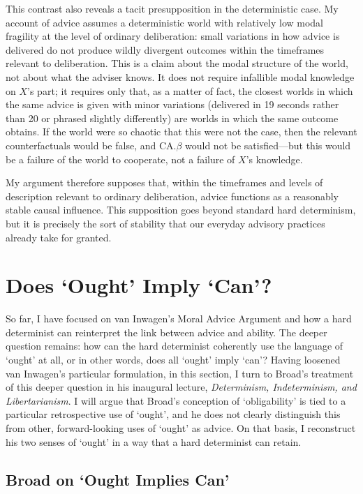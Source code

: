 This contrast also reveals a tacit presupposition in the deterministic
case. My account of advice assumes a deterministic world with relatively
low modal fragility at the level of ordinary deliberation: small
variations in how advice is delivered do not produce wildly divergent
outcomes within the timeframes relevant to deliberation. This is a claim
about the modal structure of the world, not about what the adviser
knows. It does not require infallible modal knowledge on $X$'s part; it
requires only that, as a matter of fact, the closest worlds in which the
same advice is given with minor variations (delivered in 19 seconds
rather than 20 or phrased slightly differently) are worlds in which the
same outcome obtains. If the world were so chaotic that this were not
the case, then the relevant counterfactuals would be false, and CA.$\beta$
would not be satisfied---but this would be a failure of the world to
cooperate, not a failure of $X$'s knowledge.

My argument therefore supposes that, within the timeframes and levels of
description relevant to ordinary deliberation, advice functions as a
reasonably stable causal influence. This supposition goes beyond
standard hard determinism, but it is precisely the sort of stability
that our everyday advisory practices already take for granted.

\section{Does `Ought' Imply `Can'?}

So far, I have focused on van Inwagen's Moral Advice Argument and how a
hard determinist can reinterpret the link between advice and ability.
The deeper question remains: how can the hard determinist coherently use
the language of `ought' at all, or in other words, does all `ought'
imply `can'? Having loosened van Inwagen's particular formulation, in
this section, I turn to Broad's treatment of this deeper question in his
inaugural lecture, \emph{Determinism, Indeterminism, and
Libertarianism}. I will argue that Broad's conception of `obligability'
is tied to a particular retrospective use of `ought', and he does not
clearly distinguish this from other, forward-looking uses of `ought' as
advice. On that basis, I reconstruct his two senses of `ought' in a way
that a hard determinist can retain.

\subsection{Broad on `Ought Implies Can'}

